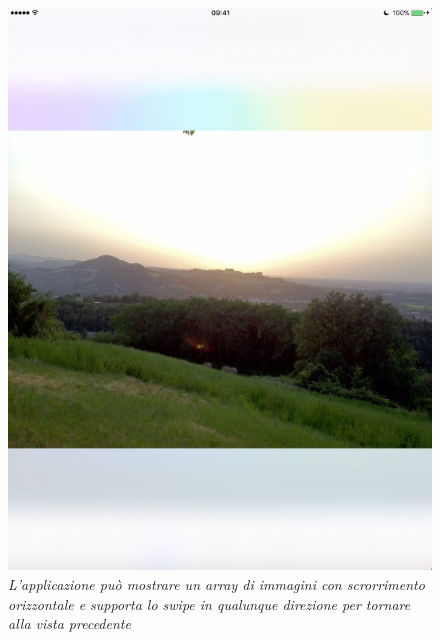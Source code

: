 \begin{figure}[H]
      \centering
      \includegraphics[scale=0.70]{immagini/app_foto.jpg}
            \vspace{0.8cm}
            \caption{\textit{L'applicazione può mostrare un array di immagini con scrorrimento orizzontale e supporta lo swipe in qualunque direzione per tornare alla vista precedente}}
\end{figure}

